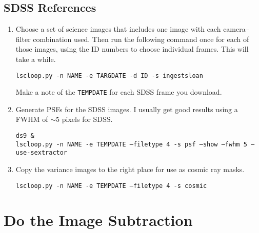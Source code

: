 \subsection{SDSS References}
\begin{enumerate}

\item Choose a set of science images that includes one image with each camera--filter combination used. Then run the following command once for each of those images, using the ID numbers to choose individual frames. This will take a while.

{\tt lscloop.py -n NAME -e TARGDATE -d ID -s ingestsloan }

Make a note of the {\tt TEMPDATE} for each SDSS frame you download.

\item Generate PSFs for the SDSS images. I usually get good results using a FWHM of $\sim 5$ pixels for SDSS.

{\tt ds9 \& } \\
{\tt lscloop.py -n NAME -e TEMPDATE --filetype 4 -s psf --show --fwhm 5 --use-sextractor }

\item Copy the variance images to the right place for use as cosmic ray masks.

{\tt lscloop.py -n NAME -e TEMPDATE --filetype 4 -s cosmic }

\end{enumerate}

\section{Do the Image Subtraction}

